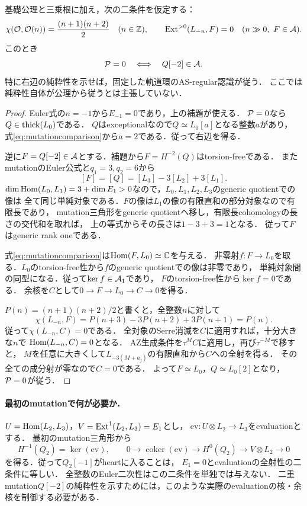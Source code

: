 \documentclass[11pt,a4paper]{ltjsarticle}
\begin{document}
\begin{proposition}[純粋性から生成障害の消滅へ]\label{prop:puritykillsdefect}
基礎公理と三乗根に加え，次の二条件を仮定する：
\[
 \chi(\mathcal O,\mathcal O(n))=\frac{(n+1)(n+2)}2\quad(n\in\mathbb Z),\qquad
 \operatorname{Ext}^{>0}(L_{-n},F)=0\quad(n\gg0,\ F\in\mathcal A).
\]
このとき
\[
 \mathcal P=0\quad\Longleftrightarrow\quad Q[-2]\in\mathcal A.
\]
特に右辺の純粋性を示せば，固定した軌道環のAS-regular認識が従う．
ここでは純粋性自体が公理から従うとは主張していない．
\end{proposition}
\begin{proof}
Euler式の$n=-1$から$E_{-1}=0$であり，上の補題が使える．
$\mathcal P=0$なら$Q\in\operatorname{thick}(L_0)$である．
$Q$はexceptionalなので$Q\simeq L_0[a]$となる整数$a$があり，
式\eqref{eq:mutationcomparison}から$a=2$である．従って右辺を得る．

逆に$F=Q[-2]\in\mathcal A$とする．補題から$F=H^{-2}(Q)$はtorsion-freeである．
またmutationのEuler公式と$q_1=3,q_2=6$から
\[
 [F]=[Q]=[L_3]-3[L_2]+3[L_1].
\]
$\dim\operatorname{Hom}(L_0,L_1)=3+\dim E_1>0$なので，$L_0,L_1,L_2,L_3$のgeneric quotientでの像は
全て同じ単純対象である．$F$の像は$L_1$の像の有限直和の部分対象なので有限長であり，
mutation三角形をgeneric quotientへ移し，有限長cohomologyの長さの交代和を取れば，
上の等式からその長さは$1-3+3=1$となる．
従って$F$はgeneric rank oneである．

式\eqref{eq:mutationcomparison}は$\operatorname{Hom}(F,L_0)\simeq\mathbb C$を与える．
非零射$f:F\to L_0$を取る．$L_0$のtorsion-free性から$f$のgeneric quotientでの像は非零であり，
単純対象間の同型になる．従って$\ker f\in\mathcal A_1$であり，
$F$のtorsion-free性から$\ker f=0$である．
余核を$C$として$0\to F\to L_0\to C\to0$を得る．

$P(n)=(n+1)(n+2)/2$と書くと，全整数$n$に対して
\[
 \chi(L_{-n},F)=P(n+3)-3P(n+2)+3P(n+1)=P(n).
\]
従って$\chi(L_{-n},C)=0$である．
全対象のSerre消滅を$C$に適用すれば，十分大きな$n$で
$\operatorname{Hom}(L_{-n},C)=0$となる．
AZ生成条件を$\tau^M C$に適用し，再び$\tau^{-M}$で移すと，
$M$を任意に大きくして$L_{-3(M+a_j)}$の有限直和から$C$への全射を得る．
その全ての成分射が零なので$C=0$である．
よって$F\simeq L_0$，$Q\simeq L_0[2]$となり，$\mathcal P=0$が従う．
\end{proof}

\paragraph{最初のmutationで何が必要か．}
$U=\operatorname{Hom}(L_2,L_3)$，$V=\operatorname{Ext}^1(L_2,L_3)=E_1$とし，
$\mathrm{ev}:U\otimes L_2\to L_3$をevaluationとする．
最初のmutation三角形から
\[
 H^{-1}(Q_2)=\ker(\mathrm{ev}),\qquad
 0\to\operatorname{coker}(\mathrm{ev})\to H^0(Q_2)
 \to V\otimes L_2\to0
\]
を得る．従って$Q_2[-1]$がheartに入ることは，
$E_1=0$とevaluationの全射性の二条件に等しい．
全整数のEuler二次性はこの二条件を単独では与えない．
二重mutation$Q[-2]$の純粋性を示すためには，このような実際のevaluationの核・余核を制御する必要がある．
\end{document}
